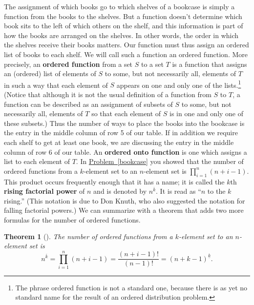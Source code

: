 \documentclass[10pt,]{book}
\newcommand{\terminology}[1]{\textbf{#1}}
\theoremstyle{plain}
\newtheorem{theorem}{Theorem}[section]
\theoremstyle{definition}
\numberwithin{equation}{chapter}
\begin{document}
The assignment of which books go to which shelves of a bookcase is simply a function from the books to the shelves. But a function doesn't determine which book sits to the left of which others on the shelf, and this information is part of how the books are arranged on the shelves. In other words, the order in which the shelves receive their books matters.  Our function must thus assign an ordered list of books to each shelf. We will call such a function an ordered function. More precisely, an \terminology{ordered function} from a set \(S\) to a set \(T\) is a function that assigns an (ordered) list of elements of \(S\) to some, but not necessarily all, elements of \(T\) in such a way that each element of \(S\) appears on one and only one of the lists.\footnote{The phrase ordered function is not a standard one, because there is as yet no standard name for the result of an ordered distribution problem.\label{fn-6}} (Notice that although it is not the usual definition of a function from \(S\) to \(T\), a function can be described as an assignment of subsets of \(S\) to some, but not necessarily all, elements of \(T\) so that each element of \(S\) is in one and only one of these subsets.) Thus the number of ways to place the books into the bookcase is the entry in the middle column of row 5 of our table. If in addition we require each shelf to get at least one book, we are discussing the entry in the middle column of row 6 of our table. An \terminology{ordered onto function} is one which assigns a list to each element of \(T\). In \hyperref[bookcase]{Problem~\ref{bookcase}} you showed that the number of ordered functions from a \(k\)-element set to an \(n\)-element set is \(\displaystyle \prod_{i=1}^n (n+i-1)\). This product occurs frequently enough that it has a name; it is called the \(k\)\/th \terminology{rising factorial power} of \(n\) and is denoted by \(n^{\overline{k}}\).  It is read as ``\(n\) to the \(k\) rising.'' (This notation is due to Don Knuth, who also suggested the notation for falling factorial powers.) We can summarize with a theorem that adds two more formulas for the number of ordered functions.%
\begin{theorem}[{}]\label{theorem-6}
The number of ordered functions from a \(k\)-element set to an \(n\)-element set is%
\begin{equation*}
n^{\overline{k}}=\prod_{i=1}^n (n+i-1) = \frac{(n+i-1)!}{(n-1)!} =
(n+k-1)^{\underline{k}}.
\end{equation*}
%
\end{theorem}
\typeout{************************************************}
\typeout{************************************************}
\end{document}
